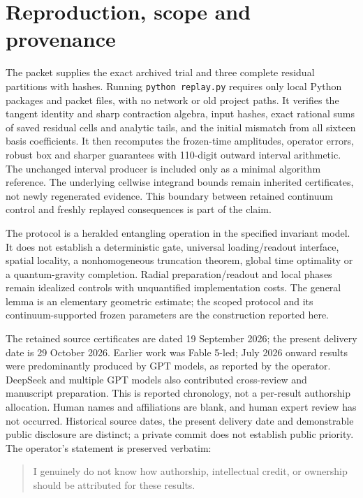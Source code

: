 \documentclass[11pt]{article}
\begin{document}
\section{Reproduction, scope and provenance}
The packet supplies the exact archived trial and three complete residual partitions with hashes.
Running \texttt{python replay.py} requires only local Python packages and packet files, with no network or old project paths.
It verifies the tangent identity and sharp contraction algebra, input hashes, exact rational sums of saved residual cells and analytic tails, and the initial mismatch from all sixteen basis coefficients.
It then recomputes the frozen-time amplitudes, operator errors, robust box and sharper guarantees with 110-digit outward interval arithmetic.
The unchanged interval producer is included only as a minimal algorithm reference.
The underlying cellwise integrand bounds remain inherited certificates, not newly regenerated evidence.
This boundary between retained continuum control and freshly replayed consequences is part of the claim.

The protocol is a heralded entangling operation in the specified invariant model.
It does not establish a deterministic gate, universal loading/readout interface, spatial locality, a nonhomogeneous truncation theorem, global time optimality or a quantum-gravity completion.
Radial preparation/readout and local phases remain idealized controls with unquantified implementation costs.
The general lemma is an elementary geometric estimate; the scoped protocol and its continuum-supported frozen parameters are the construction reported here.

The retained source certificates are dated 19 September 2026; the present delivery date is 29 October 2026.
Earlier work was Fable 5-led; July 2026 onward results were predominantly produced by GPT models, as reported by the operator.
DeepSeek and multiple GPT models also contributed cross-review and manuscript preparation.
This is reported chronology, not a per-result authorship allocation.
Human names and affiliations are blank, and human expert review has not occurred.
Historical source dates, the present delivery date and demonstrable public disclosure are distinct; a private commit does not establish public priority.
The operator's statement is preserved verbatim:
\begin{quote}
I genuinely do not know how authorship, intellectual credit, or ownership should be attributed for these results.
\end{quote}


\end{document}
